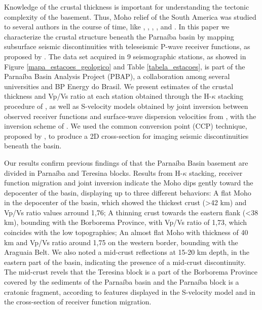 \documentclass[paper,11pt]{geophysics}
\begin{document}
Knowledge of the crustal thickness is important for understanding the tectonic complexity of the basement. Thus, Moho relief of the South America was studied to several authors in the course of time, like \cite{feng_group_velocity_2004}, \cite{feng_upper_2007}, \cite{lloyd_moho_2010}, \cite{van_der_meijde_gravity_2013}, \cite{assumpcao_models_2013} and \cite{assumpcao_crustal_2013}. In this paper we characterize the crustal structure beneath the Parnaíba basin by mapping subsurface seismic discontinuities with teleseismic P-wave receiver functions, as proposed by \cite{langston_structure_1979}. The data set acquired in 9 seismographic stations, as showed in Figure \ref{mapa_estacoes_geologico} and Table \ref{tabela_estacoes}, is part of the Parnaíba Basin Analysis Project (PBAP), a collaboration among several universities and BP Energy do Brasil. We present estimates of the crustal thickness and Vp/Vs ratio at each station obtained through the H-$\kappa$ stacking procedure of \cite{zhu_moho_2000}, as well as S-velocity models obtained by joint inversion between observed receiver functions and surface-wave dispersion velocities from \cite{feng_upper_2007}, with the  inversion scheme of \cite{julia_joint_2000}. We used the common conversion point (CCP) technique, proposed by \cite{frassetto_improved_2010}, to produce a 2D cross-section for imaging seismic discontinuities beneath the basin.

Our results confirm previous findings of \cite{de_castro_crustal_2014} that the Parnaíba Basin basement are divided in Parnaíba and Teresina blocks. Results from H-$\kappa$ stacking, receiver function migration and joint inversion indicate the Moho dips gently toward the depocenter of the basin, displaying up to three different behaviors: A flat Moho in the depocenter of the basin, which showed the thickest crust (>42 km) and Vp/Vs ratio values arround 1,76; A thinning crust towards the eastern flank (<38 km), bounding with the Borborema Province, with Vp/Vs ratio of 1,73, which coincides with the low topographies; An almost flat Moho with thickness of 40 km and Vp/Vs ratio around 1,75 on the western border, bounding with the Araguaia Belt. We also noted a mid-crust reflections at 15-20 km depth, in the eastern part of the basin, indicating the presence of a mid-crust discontinuity. The mid-crust revels that the Teresina block is a part of the Borborema Province covered by the sediments of the Parnaíba basin and the Parnaíba block is a cratonic fragment, according to features displayed in the S-velocity model and in the cross-section of receiver function migration.
\end{document}
